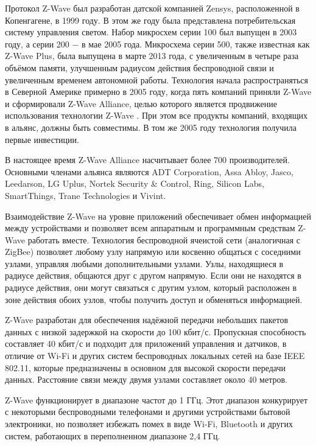 	Протокол Z-Wave был разработан датской компанией Zensys, расположенной в Копенгагене, 
	в 1999 году. В этом же году была представлена потребительская 
	систему управления светом. Набор микросхем серии 100 был выпущен в 2003 году, а серии 200 $-$ 
	в мае 2005 года. Микросхема серии 500, также известная как Z-Wave Plus, была выпущена в марте 2013 года,
	с увеличенным в четыре раза объёмом памяти, улучшенным радиусом действия беспроводной связи и 
	увеличенным временем автономной работы. Технология начала распространяться в Северной Америке 
	примерно в 2005 году, когда пять компаний приняли Z-Wave и сформировали Z-Wave Alliance, целью 
	которого является продвижение использования технологии Z-Wave \cite{z-wave-alliance}. При этом 
	все продукты компаний, входящих в альянс, должны быть совместимы. В том же 2005 году технология
	получила первые инвестиции.
	
	В настоящее время Z-Wave Alliance насчитывает более 700 производителей. Основными членами альянса 
	являются ADT Corporation, Assa Abloy, Jasco, Leedarson, LG Uplus, Nortek Security \& Control, Ring, Silicon Labs, 
	SmartThings, Trane Technologies и Vivint.
	
	Взаимодействие Z-Wave на уровне приложений обеспечивает обмен информацией между устройствами 
	и позволяет всем аппаратным и программным средствам Z-Wave работать вместе. Технология беспроводной 
	ячеистой сети (аналогичная с ZigBee) позволяет любому узлу напрямую или косвенно общаться с соседними 
	узлами, управляя любыми дополнительными узлами. Узлы, находящиеся в радиусе действия, общаются друг 
	с другом напрямую. Если они не находятся в радиусе действия, они могут связаться с другим узлом, 
	который расположен в зоне действия обоих узлов, чтобы получить доступ и обменяться информацией.
	
	Z-Wave разработан для обеспечения надёжной передачи небольших пакетов данных с низкой задержкой 
	на скорости до 100 кбит/с. Пропускная способность составляет 40 кбит/с и подходит для приложений 
	управления и датчиков, в отличие от Wi-Fi и других систем беспроводных локальных сетей на базе IEEE 802.11, 
	которые предназначены в основном для высокой скорости передачи данных. Расстояние связи между 
	двумя узлами составляет около 40 метров.
	
	Z-Wave функционирует в диапазоне частот до 1 ГГц. Этот диапазон конкурирует с некоторыми беспроводными 
	телефонами и другими устройствами бытовой электроники, но позволяет избежать помех в виде Wi-Fi, Bluetooth 
	и других систем, работающих в переполненном диапазоне 2,4 ГГц.
	
